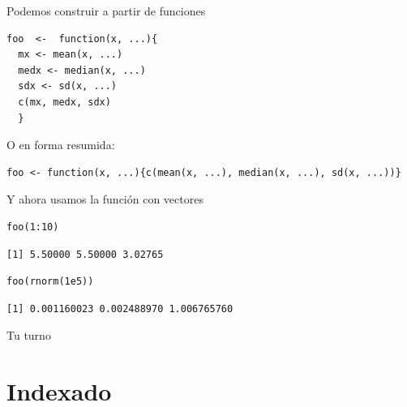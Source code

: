 \documentclass[xcolor={usenames,svgnames,dvipsnames}]{beamer}
\begin{document}
\begin{frame}[fragile,label=sec-2-5-2]{Podemos construir a partir de funciones}
 \lstset{language=R,label= ,caption= ,numbers=none}
\begin{lstlisting}
foo  <-  function(x, ...){
  mx <- mean(x, ...)
  medx <- median(x, ...)
  sdx <- sd(x, ...)
  c(mx, medx, sdx)
  }
\end{lstlisting}

O en forma resumida:
\lstset{language=R,label= ,caption= ,numbers=none}
\begin{lstlisting}
foo <- function(x, ...){c(mean(x, ...), median(x, ...), sd(x, ...))}
\end{lstlisting}
\end{frame}


\begin{frame}[fragile,label=sec-2-5-3]{Y ahora usamos la función con vectores}
 \lstset{language=R,label= ,caption= ,numbers=none}
\begin{lstlisting}
foo(1:10)
\end{lstlisting}

\begin{verbatim}
[1] 5.50000 5.50000 3.02765
\end{verbatim}

\lstset{language=R,label= ,caption= ,numbers=none}
\begin{lstlisting}
foo(rnorm(1e5))
\end{lstlisting}

\begin{verbatim}
[1] 0.001160023 0.002488970 1.006765760
\end{verbatim}
\end{frame}

\begin{frame}[label=sec-2-5-4]{Tu turno}
\end{frame}
\section{Indexado}
\label{sec-3}
\end{document}
